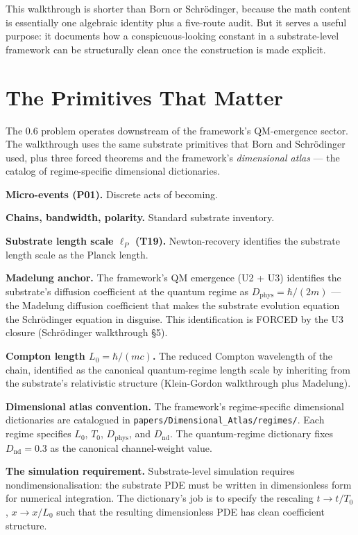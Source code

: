 \documentclass[11pt,a4paper]{article}
\begin{document}
This walkthrough is shorter than Born or Schr\"odinger, because the math content is essentially one algebraic identity plus a five-route audit. But it serves a useful purpose: it documents how a conspicuous-looking constant in a substrate-level framework can be structurally clean once the construction is made explicit.

\section{The Primitives That Matter}

The 0.6 problem operates downstream of the framework's QM-emergence sector. The walkthrough uses the same substrate primitives that Born and Schr\"odinger used, plus three forced theorems and the framework's \emph{dimensional atlas} --- the catalog of regime-specific dimensional dictionaries.

\textbf{Micro-events (P01).} Discrete acts of becoming.

\textbf{Chains, bandwidth, polarity.} Standard substrate inventory.

\textbf{Substrate length scale $\ell_P$ (T19).} Newton-recovery identifies the substrate length scale as the Planck length.

\textbf{Madelung anchor.} The framework's QM emergence (U2 + U3) identifies the substrate's diffusion coefficient at the quantum regime as $D_\mathrm{phys} = \hbar/(2m)$ --- the Madelung diffusion coefficient that makes the substrate evolution equation the Schr\"odinger equation in disguise. This identification is FORCED by the U3 closure (Schr\"odinger walkthrough \S5).

\textbf{Compton length $L_0 = \hbar/(mc)$.} The reduced Compton wavelength of the chain, identified as the canonical quantum-regime length scale by inheriting from the substrate's relativistic structure (Klein-Gordon walkthrough plus Madelung).

\textbf{Dimensional atlas convention.} The framework's regime-specific dimensional dictionaries are catalogued in \texttt{papers/Dimensional\_Atlas/regimes/}. Each regime specifies $L_0$, $T_0$, $D_\mathrm{phys}$, and $D_\mathrm{nd}$. The quantum-regime dictionary fixes $D_\mathrm{nd} = 0.3$ as the canonical channel-weight value.

\textbf{The simulation requirement.} Substrate-level simulation requires nondimensionalisation: the substrate PDE must be written in dimensionless form for numerical integration. The dictionary's job is to specify the rescaling $t \to t/T_0$, $x \to x/L_0$ such that the resulting dimensionless PDE has clean coefficient structure.
\end{document}
